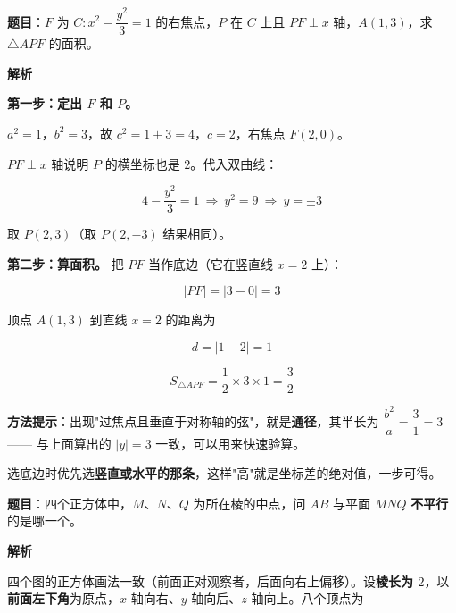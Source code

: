 
\textbf{题目}：$F$ 为 $C:x^{2}-\dfrac{y^{2}}3=1$ 的右焦点，$P$ 在 $C$ 上且 $PF\perp x$ 轴，$A(1,3)$，求 $\triangle APF$ 的面积。

\textbf{解析}

\textbf{第一步：定出 $F$ 和 $P$。}

$a^{2}=1$，$b^{2}=3$，故 $c^{2}=1+3=4$，$c=2$，右焦点 $F(2,0)$。

$PF\perp x$ 轴说明 $P$ 的横坐标也是 $2$。代入双曲线：

\[4-\frac{y^{2}}3=1\ \Longrightarrow\ y^{2}=9\ \Longrightarrow\ y=\pm3\]

取 $P(2,3)$（取 $P(2,-3)$ 结果相同）。

\textbf{第二步：算面积。} 把 $PF$ 当作底边（它在竖直线 $x=2$ 上）：

\[|PF|=|3-0|=3\]

顶点 $A(1,3)$ 到直线 $x=2$ 的距离为

\[d=|1-2|=1\]

\[S_{\triangle APF}=\frac12\times3\times1=\frac32\]


\begin{gktip}
\textbf{方法提示}：出现"过焦点且垂直于对称轴的弦"，就是\textbf{通径}，其半长为 $\dfrac{b^{2}}a=\dfrac31=3$ —— 与上面算出的 $|y|=3$ 一致，可以用来快速验算。

选底边时优先选\textbf{竖直或水平的那条}，这样"高"就是坐标差的绝对值，一步可得。
\end{gktip}

\par\medskip


\textbf{题目}：四个正方体中，$M$、$N$、$Q$ 为所在棱的中点，问 $AB$ 与平面 $MNQ$ \textbf{不平行}的是哪一个。

\begin{center}\end{center}

\begin{center}\end{center}

\textbf{解析}


四个图的正方体画法一致（前面正对观察者，后面向右上偏移）。设\textbf{棱长为 $2$}，以\textbf{前面左下角}为原点，$x$ 轴向右、$y$ 轴向后、$z$ 轴向上。八个顶点为

